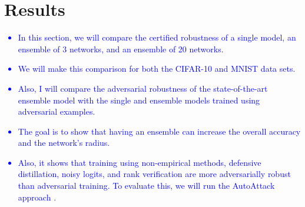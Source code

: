 \documentclass{article}
\begin{document}
\section{Results}
\textcolor{blue}{
\begin{itemize}
    \item In this section, we will compare the certified robustness of a single model, an ensemble of 3 networks, and an ensemble of 20 networks.
    \item We will make this comparison for both the CIFAR-10 and MNIST data sets.
    \item Also, I will compare the adversarial robustness of the state-of-the-art ensemble model with the single and ensemble models trained using adversarial examples. 
    \item The goal is to show that having an ensemble can increase the overall accuracy and the network's radius. 
    \item Also, it shows that training using non-empirical methods, defensive distillation, noisy logits, and rank verification are more adversarially robust than adversarial training. To evaluate this, we will run the AutoAttack approach \cite{reference5}.
\end{itemize}
}
\end{document}
